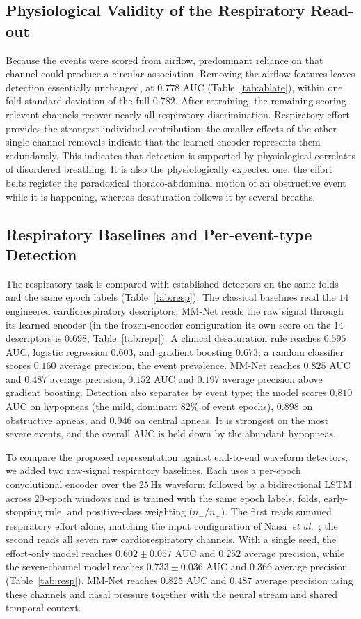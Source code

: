 \documentclass{ieeeaccess}
\newcommand{\mmAuc}{0.825}
\newcommand{\mmAp}{0.487}
\newcommand{\fzAuc}{0.782}
\newcommand{\noflowAuc}{0.778}
\begin{document}
\subsection{Physiological Validity of the Respiratory Read-out}
\label{sec:noflow}
Because the events were scored from airflow, predominant reliance on that channel could
produce a circular association. Removing the airflow features leaves detection essentially
unchanged, at $\noflowAuc$ AUC (Table~\ref{tab:ablate}), within one fold standard deviation of
the full $\fzAuc$. After retraining, the remaining scoring-relevant channels recover nearly
all respiratory discrimination. Respiratory effort provides the strongest individual contribution;
the smaller effects of the other single-channel removals indicate that the
learned encoder represents them redundantly. This indicates that detection is supported by
physiological correlates of disordered breathing. It is also the physiologically expected one: the effort belts register the
paradoxical thoraco-abdominal motion of an obstructive event while it is happening, whereas
desaturation follows it by several breaths.

\subsection{Respiratory Baselines and Per-event-type Detection}
The respiratory task is compared with established detectors on the same folds and the same
epoch labels (Table~\ref{tab:resp}). The classical baselines read the $14$ engineered
cardiorespiratory descriptors; MM-Net reads the raw signal through its learned encoder (in the
frozen-encoder configuration its own score on the $14$ descriptors is $0.698$,
Table~\ref{tab:repr}). A clinical desaturation rule reaches $0.595$ AUC, logistic regression
$0.603$, and gradient boosting $0.673$; a random classifier scores $0.160$ average precision, the
event prevalence. MM-Net reaches $\mmAuc$ AUC and $\mmAp$ average precision, $0.152$ AUC and
$0.197$ average precision above gradient boosting. Detection also separates by event type: the
model scores $0.810$ AUC on hypopneas (the mild, dominant $82\%$ of event epochs), $0.898$ on
obstructive apneas, and $0.946$ on central apneas. It is strongest on the most severe events,
and the overall AUC is held down by the abundant hypopneas.

To compare the proposed representation against end-to-end waveform detectors, we added two
raw-signal respiratory baselines. Each uses a per-epoch convolutional encoder over the
$25$\,Hz waveform followed by a bidirectional LSTM across $20$-epoch windows and is trained
with the same epoch labels, folds, early-stopping rule, and positive-class weighting
($n_-/n_+$). The first reads summed respiratory effort alone, matching the input configuration
of Nassi~\emph{et al.}~\cite{nassi2022effortbelt}; the second reads all seven raw
cardiorespiratory channels. With a single seed, the effort-only model reaches
$0.602 \pm 0.057$ AUC and $0.252$ average precision, while the seven-channel model
reaches $0.733 \pm 0.036$ AUC and $0.366$ average precision (Table~\ref{tab:resp}).
MM-Net reaches $\mmAuc$ AUC and $\mmAp$ average precision using these channels and nasal
pressure together with the neural stream and shared temporal context.
\end{document}
